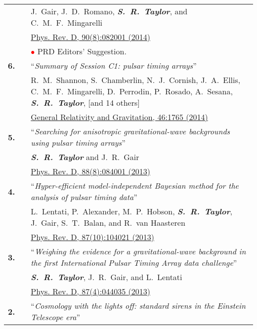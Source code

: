 \documentclass[11pt,letterpaper,sans]{moderncv}
\begin{document}
{\begin{longtable}{rp{0.3cm}p{15.8cm}}
&& J.~Gair, J.~D.~Romano, \textit{\textbf{S.~R.~Taylor}}, and C.~M.~F.~Mingarelli \\ 
&& \href{http://journals.aps.org/prd/abstract/10.1103/PhysRevD.90.082001}{{\color{color1} Phys. Rev. D, 90(8):082001 (2014)}} \\
&& \textcolor{red}{$\bullet$} PRD Editors' Suggestion.\vspace{0.09cm}\\
\textbf{6.} & & ``\textit{Summary of Session C1: pulsar timing arrays}'' \\ 
&& R.~M.~Shannon, S.~Chamberlin, N.~J.~Cornish, J.~A.~Ellis, C.~M.~F.~Mingarelli, D.~Perrodin, P.~Rosado, A.~Sesana, \textit{\textbf{S.~R.~Taylor}}, [and 14 others] \\ 
&& \href{http://link.springer.com/article/10.1007\%2Fs10714-014-1765-4}{{\color{color1} General Relativity and Gravitation, 46:1765 (2014)}} \vspace{0.09cm}\\
\textbf{5.} & & ``\textit{Searching for anisotropic gravitational-wave backgrounds using pulsar timing arrays}'' \\ 
&& \textit{\textbf{S.~R.~Taylor}} and J.~R.~Gair \\ 
&& \href{http://journals.aps.org/prd/abstract/10.1103/PhysRevD.88.084001}{{\color{color1} Phys. Rev. D, 88(8):084001 (2013)}} \vspace{0.09cm}\\
\textbf{4.} & & ``\textit{Hyper-efficient model-independent Bayesian method for the analysis of pulsar timing data}'' \\ 
&& L.~Lentati, P.~Alexander, M.~P.~Hobson, \textit{\textbf{S.~R.~Taylor}}, J.~Gair, S.~T.~Balan, and R.~van Haasteren \\ 
&& \href{http://journals.aps.org/prd/abstract/10.1103/PhysRevD.87.104021}{{\color{color1} Phys. Rev. D, 87(10):104021 (2013)}} \vspace{0.09cm}\\
\textbf{3.} & & ``\textit{Weighing the evidence for a gravitational-wave background in the first International Pulsar Timing Array data challenge}'' \\ 
&& \textit{\textbf{S.~R.~Taylor}}, J.~R.~Gair, and L.~Lentati \\ 
&& \href{http://journals.aps.org/prd/abstract/10.1103/PhysRevD.87.044035}{{\color{color1} Phys. Rev. D, 87(4):044035 (2013)}} \vspace{0.09cm}\\
\textbf{2.} & & ``\textit{Cosmology with the lights off: standard sirens in the Einstein Telescope era}'' \\ 

\end{longtable}}
\end{document}
